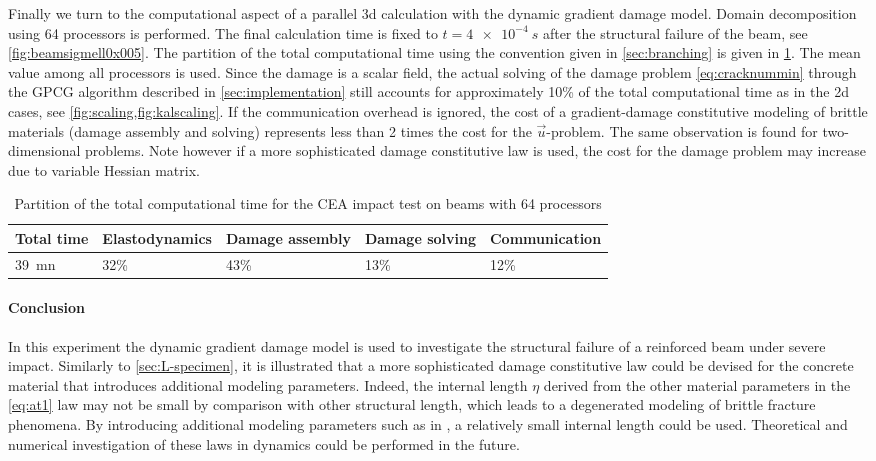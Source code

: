 Finally we turn to the computational aspect of a parallel 3d calculation with the dynamic gradient damage model. Domain decomposition using 64 processors is performed. The final calculation time is fixed to $t=\SI{4e-4}{s}$ after the structural failure of the beam, see \cref{fig:beamsigmell0x005}. The partition of the total computational time using the convention given in \cref{sec:branching} is given in \cref{tab:partimebeam}. The mean value among all processors is used. Since the damage is a scalar field, the actual solving of the damage problem \eqref{eq:cracknummin} through the GPCG algorithm described in \cref{sec:implementation} still accounts for approximately 10\% of the total computational time as in the 2d cases, see \cref{fig:scaling,fig:kalscaling}. If the communication overhead is ignored, the cost of a gradient-damage constitutive modeling of brittle materials (damage assembly and solving) represents less than 2 times the cost for the $\vec{u}$-problem. The same observation is found for two-dimensional problems. Note however if a more sophisticated damage constitutive law is used, the cost for the damage problem may increase due to variable Hessian matrix.
\begin{table}[htbp]
\centering
\caption{Partition of the total computational time for the CEA impact test on beams with 64 processors} \label{tab:partimebeam}
\begin{tabular}{lllll} \toprule
Total time & Elastodynamics & Damage assembly & Damage solving & Communication \\ \midrule
\SI{39}{mn} & 32\% & 43\% & 13\% & 12\% \\ \bottomrule
\end{tabular}
\end{table}

\paragraph*{Conclusion} In this experiment the dynamic gradient damage model is used to investigate the structural failure of a reinforced beam under severe impact. Similarly to \cref{sec:L-specimen}, it is illustrated that a more sophisticated damage constitutive law could be devised for the concrete material that introduces additional modeling parameters. Indeed, the internal length $\eta$ derived from the other material parameters in the \eqref{eq:at1} law may not be small by comparison with other structural length, which leads to a degenerated modeling of brittle fracture phenomena. By introducing additional modeling parameters such as in \cite{LorentzCuvilliezKazymyrenko:2011,AlessiMarigoVidoli:2015}, a relatively small internal length could be used. Theoretical and numerical investigation of these laws in dynamics could be performed in the future.

